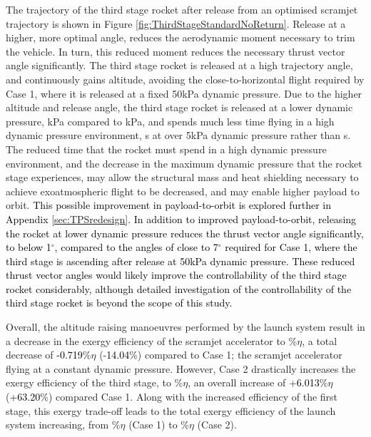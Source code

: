 The trajectory of the third stage rocket after release from an optimised scramjet trajectory is shown in Figure \ref{fig:ThirdStageStandardNoReturn}. Release at a higher, more optimal angle, reduces the aerodynamic moment necessary to trim the vehicle. In turn, this reduced moment reduces the necessary thrust vector angle significantly. The third stage rocket is released at a high trajectory angle, and continuously gains altitude, avoiding the close-to-horizontal flight required by Case 1, where it is released at a fixed 50kPa dynamic pressure.
Due to the higher altitude and release angle, the third stage rocket is released at a lower dynamic pressure, \secondthirdSeparationqCdStandardNoReturn kPa compared to \secondthirdSeparationqConstqNoReturn kPa, and spends much less time flying in a high dynamic pressure environment, \thirdqOverFiveStandard s at over 5kPa dynamic pressure rather than \thirdqOverFiveConstqNoReturn s. 
The reduced time that the rocket must spend in a high dynamic pressure environment, and the decrease in the maximum dynamic pressure that the rocket stage experiences, may allow the structural mass and heat shielding necessary to achieve exoatmospheric flight to be decreased, and may enable higher payload to orbit. \textcolor{black}{This possible improvement in payload-to-orbit is explored further in Appendix \ref{sec:TPSredesign}. In addition to improved payload-to-orbit, releasing the rocket at lower dynamic pressure reduces the thrust vector angle significantly, to below 1$^\circ$, compared to the angles of close to 7$^\circ$ required for Case 1, where the third stage is ascending after release at 50kPa dynamic pressure. These reduced thrust vector angles would likely improve the controllability of the third stage rocket considerably, although detailed investigation of the controllability of the third stage rocket is beyond the scope of this study.} 

Overall, the altitude raising manoeuvres performed by the launch system result in a decrease in the exergy efficiency of the scramjet accelerator to \secondExergyEffStandardNoReturn\%$\eta$, a total decrease of \textcolor{black}{-0.719}\%$\eta$ (-\textcolor{black}{14.04}\%) compared to Case 1; the scramjet accelerator flying at a constant dynamic pressure. However, Case 2 drastically increases the exergy efficiency of the third stage, to \thirddExergyEffStandardNoReturn\%$\eta$, an overall increase of +\textcolor{black}{6.013}\%$\eta$ (\textcolor{black}{+63.20}\%) compared Case 1.  
Along with the increased efficiency of the first stage, this exergy trade-off leads to the total exergy efficiency of the launch system increasing, from \totalExergyEffConstqNoReturn\%$\eta$ (Case 1) to \totalExergyEffStandardNoReturn\%$\eta$ (Case 2). 

